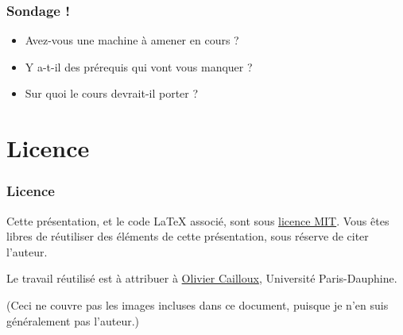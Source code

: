\documentclass[english, french]{beamer}
\begin{document}
\begin{frame}
	\frametitle{Sondage !}
	\begin{itemize}
		\item Avez-vous une machine à amener en cours ?
		\item Y a-t-il des prérequis qui vont vous manquer ?
		\item Sur quoi le cours devrait-il porter ?
	\end{itemize}
\end{frame}

\appendix
\AtBeginSection{
}
\section{Licence}
\begin{frame}
	\frametitle{Licence}
	Cette présentation, et le code LaTeX associé, sont sous \href{http://opensource.org/licenses/MIT}{licence MIT}. Vous êtes libres de réutiliser des éléments de cette présentation, sous réserve de citer l’auteur.
	
	Le travail réutilisé est à attribuer à \href{http://www.lamsade.dauphine.fr/~ocailloux/}{Olivier Cailloux}, Université Paris-Dauphine.
	
	\small{(Ceci ne couvre pas les images incluses dans ce document, puisque je n’en suis généralement pas l’auteur.)}
\end{frame}
\end{document}
